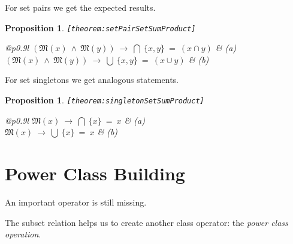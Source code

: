 \documentclass[a4paper,german,10pt,twoside]{book}
\newtheorem{prop}[thm]{Proposition}
\theoremstyle{definition}
\theoremstyle{remark}
\begin{document}
\par
For set pairs we get the expected results.

\begin{prop}
\label{theorem:setPairSetSumProduct} \hypertarget{theorem:setPairSetSumProduct}{}
{\tt \tiny [\verb]theorem:setPairSetSumProduct]]}
\mbox{}
\begin{longtable}{{@{\extracolsep{\fill}}p{0.9\linewidth}l}}
\centering $(\mathfrak{M}(x)\ \land\ \mathfrak{M}(y))\ \rightarrow\ \bigcap \ \{ x, y \} \ = \ (x \cap y)$ & \label{theorem:setPairSetSumProduct/a} \hypertarget{theorem:setPairSetSumProduct/a}{} \mbox{\emph{(a)}} \\
\centering $(\mathfrak{M}(x)\ \land\ \mathfrak{M}(y))\ \rightarrow\ \bigcup \ \{ x, y \} \ = \ (x \cup y)$ & \label{theorem:setPairSetSumProduct/b} \hypertarget{theorem:setPairSetSumProduct/b}{} \mbox{\emph{(b)}} 
\end{longtable}

\end{prop}


\par
For set singletons we get analogous statements.

\begin{prop}
\label{theorem:singletonSetSumProduct} \hypertarget{theorem:singletonSetSumProduct}{}
{\tt \tiny [\verb]theorem:singletonSetSumProduct]]}
\mbox{}
\begin{longtable}{{@{\extracolsep{\fill}}p{0.9\linewidth}l}}
\centering $\mathfrak{M}(x)\ \rightarrow\ \bigcap \ \{ x \} \ = \ x$ & \label{theorem:singletonSetSumProduct/a} \hypertarget{theorem:singletonSetSumProduct/a}{} \mbox{\emph{(a)}} \\
\centering $\mathfrak{M}(x)\ \rightarrow\ \bigcup \ \{ x \} \ = \ x$ & \label{theorem:singletonSetSumProduct/b} \hypertarget{theorem:singletonSetSumProduct/b}{} \mbox{\emph{(b)}} 
\end{longtable}

\end{prop}


\section{Power Class Building} \label{chapter4_section6} \hypertarget{chapter4_section6}{}
An important operator is still missing.

\par
The subset relation helps us to create another class operator: the \emph{power class operation}.
\end{document}
